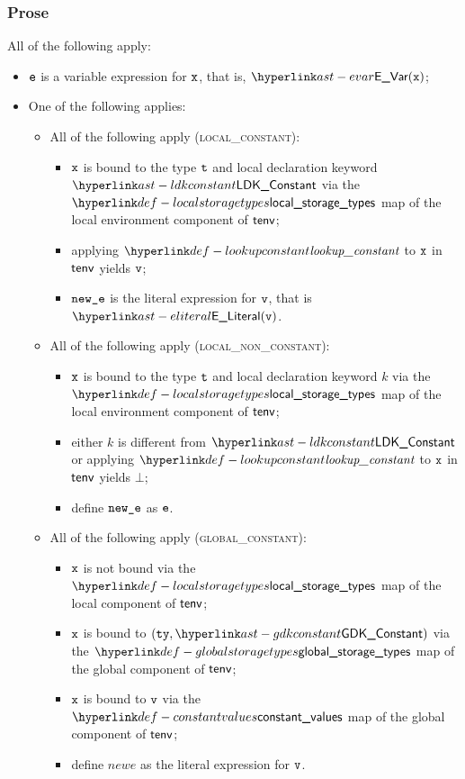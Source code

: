 \subsubsection{Prose}
All of the following apply:
\begin{itemize}
  \item $\texttt{e}$ is a variable expression for $\texttt{x}$, that is, $\EVar(\vx)$;
  \item One of the following applies:
  \begin{itemize}
    \item All of the following apply (\textsc{local\_constant}):
    \begin{itemize}
    \item $\texttt{x}$ is bound to the type $\texttt{t}$ and local declaration keyword $\LDKConstant$
          via the $\localstoragetypes$ map of the local environment component of $\textsf{tenv}$;
    \item applying $\lookupconstant$ to $\texttt{x}$ in $\textsf{tenv}$ yields $\texttt{v}$;
    \item $\texttt{new\_e}$ is the literal expression for $\texttt{v}$, that is $\eliteral{\vv}$.
    \end{itemize}

    \item All of the following apply (\textsc{local\_non\_constant}):
    \begin{itemize}
    \item $\texttt{x}$ is bound to the type $\texttt{t}$ and local declaration keyword $k$
          via the \\
          $\localstoragetypes$ map of the local environment component of $\textsf{tenv}$;
    \item either $k$ is different from $\LDKConstant$ or applying $\lookupconstant$ to $\texttt{x}$ in $\textsf{tenv}$ yields $\bot$;
    \item define $\texttt{new\_e}$ as $\texttt{e}$.
    \end{itemize}

    \item All of the following apply (\textsc{global\_constant}):
    \begin{itemize}
    \item $\texttt{x}$ is not bound via the $\localstoragetypes$ map of the local component of $\textsf{tenv}$;
    \item $\texttt{x}$ is bound to $(\tty, \GDKConstant)$ via the $\globalstoragetypes$ map of the global component of $\textsf{tenv}$;
    \item $\texttt{x}$ is bound to $\texttt{v}$ via the $\constantvalues$ map of the global component of $\textsf{tenv}$;
    \item define $newe$ as the literal expression for $\texttt{v}$.
    \end{itemize}


\end{itemize}
\end{itemize}
